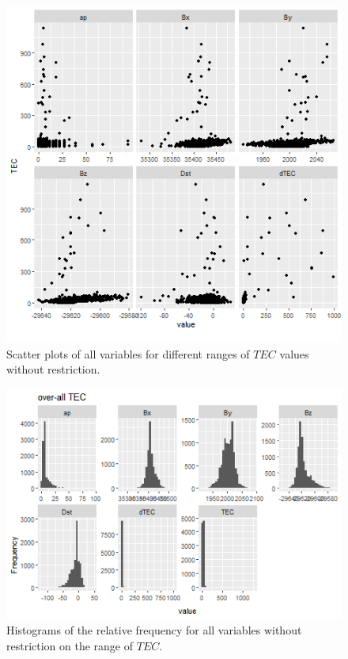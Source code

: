 \documentclass[preprint,12pt]{elsarticle}
\begin{document}
\begin{figure}
    \centering
    \includegraphics[width=0.9\linewidth]{dataset2scatterplot.png}
    \caption{Scatter plots of all variables for different ranges of $TEC$ values without restriction.}
    \label{fig:dataset2scatterplot}
\end{figure}

\begin{figure}
    \centering
    \includegraphics[width=0.9\linewidth]{allTEC_fix.png}
    \caption{Histograms of the relative frequency for all variables without restriction on the range of $TEC$.}
    \label{fig:allTEC}
\end{figure}
\end{document}
